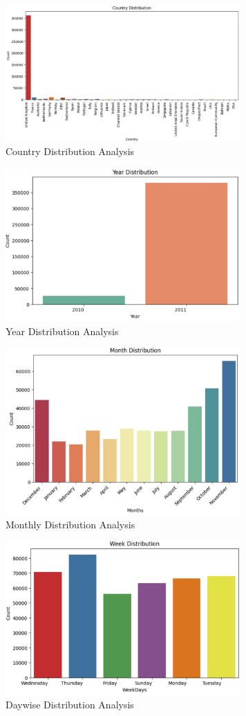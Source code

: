 \documentclass[conference]{IEEEtran}
\begin{document}
 \begin{figure}[h]
\centering
 \includegraphics[width=9cm]{cntry_dist}
 \caption{Country Distribution Analysis}
 \end{figure}
 
  \begin{figure}[h]
\centering
 \includegraphics[width=9cm]{year_dist}
 \caption{Year Distribution Analysis}
 \end{figure}
 
  \begin{figure}[h]
\centering
 \includegraphics[width=9cm]{month_dist}
 \caption{Monthly Distribution Analysis}
 \end{figure}
 
   \begin{figure}[h]
\centering
 \includegraphics[width=9cm]{week_dist}
 \caption{Daywise Distribution Analysis}
 \end{figure}
\end{document}
